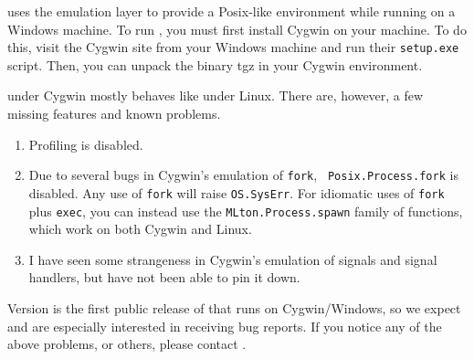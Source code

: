 
{\mlton} uses the  emulation
layer to provide a Posix-like environment while running on a Windows machine.
To run {\mlton}, you must first install Cygwin on your machine.  To do this,
visit the Cygwin site from your Windows machine and run their {\tt setup.exe}
script.  Then, you can unpack the {\mlton} binary tgz in your Cygwin
environment.

{\mlton} under Cygwin mostly behaves like {\mlton} under Linux.  There are,
however, a few missing features and known problems.

\begin{enumerate}

\item Profiling is disabled.

\item Due to several bugs in Cygwin's emulation of {\tt fork}, {\tt
Posix.Process.fork} is disabled.  Any use of {\tt fork} will raise
{\tt OS.SysErr}.  For idiomatic uses of {\tt fork} plus {\tt exec},
you can instead use the {\tt MLton.Process.spawn} family of functions, which
work on both Cygwin and Linux.

\item I have seen some strangeness in Cygwin's emulation of signals and
signal handlers, but have not been able to pin it down.

\end{enumerate}


Version {\version} is the first public release of {\mlton} that runs
on Cygwin/Windows, so we expect and are especially interested in
receiving bug reports.  If you notice any of the above problems, or
others, please contact {\mltonmail}.


